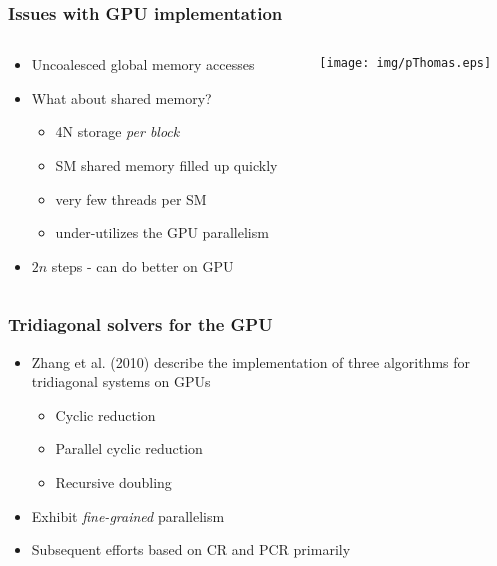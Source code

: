 \begin{frame}
\frametitle{Issues with GPU implementation}
\begin{columns}
\begin{column}{0.5\textwidth}
\begin{itemize}
    \item Uncoalesced global memory accesses
    \item What about shared memory?
        \begin{itemize}
            \item 4N storage \emph{per block}
            \item SM shared memory filled up quickly
            \item very few threads per SM
            \item under-utilizes the GPU parallelism
        \end{itemize}
    \item $2n$ steps - can do better on GPU
\end{itemize}
\end{column}
\begin{column}{0.5\textwidth}
    \texttt{[image: img/pThomas.eps]}
\end{column}
\end{columns}
\end{frame}

\begin{frame}
\frametitle{Tridiagonal solvers for the GPU}
\begin{itemize}
\item Zhang et al. (2010) describe the implementation
    of three algorithms for tridiagonal systems on GPUs
    \begin{itemize}
        \item Cyclic reduction
        \item Parallel cyclic reduction
        \item Recursive doubling
    \end{itemize}
\item Exhibit \emph{fine-grained} parallelism
\item Subsequent efforts based on CR and PCR primarily
\end{itemize}
\end{frame}

